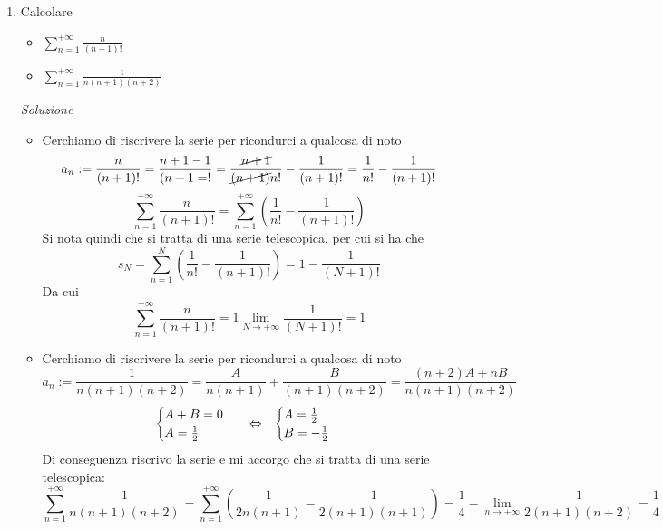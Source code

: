 \documentclass{article}
\begin{document}
\begin{enumerate}[label=\textbf{Esercizio 
    8.\arabic*.},itemindent=*]
\begin{itemize}
    \item divergente se $q\geq1$
    \item indeterminata se $q\leq -1$
\end{itemize}
Si tratta quindi di risolvere 
\(\left|\frac{2+\alpha}{1-\alpha}\right|<1\)
e si ottiene che la serie è
\begin{itemize}
    \item convergente se $\alpha<-\frac{1}{2}$
    \item divergente se $-\frac{1}{2}\leq \alpha\leq 1$
    \item indeterminata se $\alpha> 1$
\end{itemize}
Inoltre se la serie converge
\[\sum_{n=0}^{+\infty}=\frac{1}{1-q}=\frac{1}{1-\frac{2+\alpha}{1-\alpha}}=\frac{\alpha-1}{2\alpha+1}\]

\item Calcolare \begin{itemize}
    \item $\sum_{n=1}^{+\infty}\frac{n}{(n+1)!}$
    \item $\sum_{n=1}^{+\infty}\frac{1}{n(n+1)(n+2)}$
\end{itemize}
\item[\textit{\large Soluzione~}]~
\begin{itemize}
    \item Cerchiamo di riscrivere la serie per ricondurci a qualcosa di noto
    \[a_n:=\frac{n}{(n+1)!}=\frac{n+1-1}{(n+1=!}=\frac{\cancel{n+1}}{\cancel{(n+1)}n!}-\frac{1}{(n+1)!}=\frac{1}{n!}-\frac{1}{(n+1)!}\]
    \[\sum_{n=1}^{+\infty}\frac{n}{(n+1)!}=\sum_{n=1}^{+\infty}\left(\frac{1}{n!}-\frac{1}{(n+1)!}\right)\]
    Si nota quindi che si tratta di una serie telescopica, per cui si ha che
    \[s_N=\sum_{n=1}^{N}\left(\frac{1}{n!}-\frac{1}{(n+1)!}\right)={1}-\frac{1}{(N+1)!}\]
    Da cui 
    \[\sum_{n=1}^{+\infty}\frac{n}{(n+1)!}=1\lim_{N\to+\infty}\frac{1}{(N+1)!}=1\]
    \item Cerchiamo di riscrivere la serie per ricondurci a qualcosa di noto
    \[a_n:=\frac{1}{n(n+1)(n+2)}=\frac{A}{n(n+1)}+\frac{B}{(n+1)(n+2)}=\frac{(n+2)A+nB}{n(n+1)(n+2)}\]
    \[\begin{cases}
        A+B=0\\
        A=\frac{1}{2}
    \end{cases}~~\Leftrightarrow~~\begin{cases}
        A=\frac{1}{2}\\
        B=-\frac{1}{2}
    \end{cases}\]
    Di conseguenza riscrivo la serie e mi accorgo che si tratta di una serie telescopica:
    \[\sum_{n=1}^{+\infty}\frac{1}{n(n+1)(n+2)}=\sum_{n=1}^{+\infty}\left( \frac{1}{2n(n+1)}-\frac{1}{2(n+1)(n+1)} \right)=\frac{1}{4}-\lim_{n\to+\infty}\frac{1}{2(n+1)(n+2)}=\frac{1}{4}\]
    
\end{itemize}

\end{enumerate}
\end{document}
